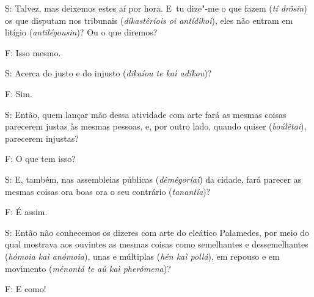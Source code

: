 S: Talvez, mas deixemos estes aí por hora. E~tu dize"-me o que fazem
(\emph{tí drôsin}) os que disputam nos tribunais (\emph{dikastêríois oi
antídikoi}), eles não entram em litígio (\emph{antilégousin})? Ou o que
diremos?

F: Isso mesmo.

S: Acerca do justo e do injusto (\emph{dikaíou te kaì
adíkou})?

F: Sim.

S: Então, quem lançar mão dessa atividade com arte fará as mesmas coisas
parecerem justas às mesmas pessoas, e, por outro lado, quando quiser
(\emph{boúlêtai}), parecerem injustas?

\bekker{[261d]} F: O que tem isso?

S: E, também, nas assembleias públicas (\emph{dêmêgoríai}) da cidade,
fará parecer as mesmas coisas ora boas ora o seu contrário
(\emph{tanantía})?

F: É assim.

S: Então não conhecemos os dizeres com arte do eleático Palamedes, por
meio do qual mostrava aos ouvintes as mesmas coisas como semelhantes e
dessemelhantes (\emph{hómoia kaì anómoia}), unas e múltiplas (\emph{hén
kaì pollá}), em repouso e em movimento (\emph{ménontá te aû kaì
pherómena})?

F: E como!

 

